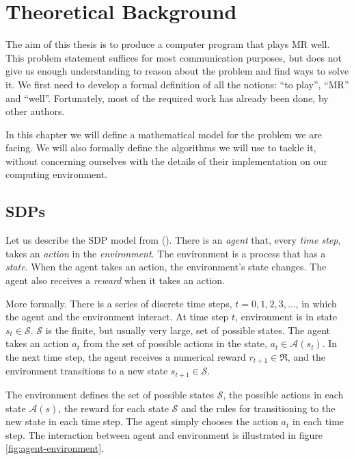 \chapter{Theoretical Background}
The aim of this thesis is to produce a computer program that plays \acl{MR}
well. This problem statement suffices for most communication purposes, but does
not give us enough understanding to reason about the problem and find ways to
solve it. We first need to develop a formal definition of all the notions: ``to
play'', ``\acl{MR}'' and ``well''. Fortunately, most of the required work has
already been done, by other authors.

In this chapter we will define a mathematical model for the problem we are
facing. We will also formally define the algorithms we will use to tackle it,
without concerning ourselves with the details of their implementation on our
computing environment.

\section{\aclp{SDP}}
Let us describe the \acf{SDP} model from
(\cite[Section~3.1]{sutton1998introduction}). There is an \emph{agent} that, every
\emph{time step}, takes an \emph{action} in the \emph{environment}. The
environment is a process that has a \emph{state}. When the agent takes an
action, the environment's state changes. The agent also receives a \emph{reward}
when it takes an action.

More formally. There is a series of discrete time steps, $t=0,1,2,3,\dots$, in
which the agent and the environment interact. At time step $t$, environment is
in state $s_t \in \mathcal{S}$. $\mathcal{S}$ is the finite, but usually very
large, set of possible states. The agent takes an action $a_t$ from the set of
possible actions in the state, $a_t \in \mathcal{A}(s_t)$. In the next time
step, the agent receives a numerical reward $r_{t+1} \in \mathfrak{R}$, and the
environment transitions to a new state $s_{t+1} \in \mathcal{S}$.

The environment defines the set of possible states $\mathcal{S}$, the possible
actions in each state $\mathcal{A}(s)$, the reward for each state $\mathcal{S}$
and the rules for transitioning to the new state in each time step. The agent
simply chooses the action $a_t$ in each time step. The interaction between agent
and environment is illustrated in figure \ref{fig:agent-environment}.


